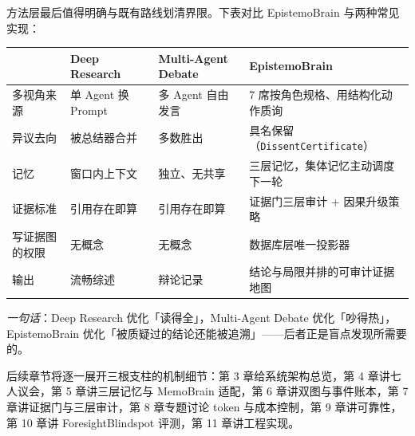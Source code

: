 方法层最后值得明确与既有路线划清界限。下表对比 EpistemoBrain 与两种常见实现：

\begin{table}[h]
\centering
\small
\begin{tabular}{@{}p{}p{}p{}p{}@{}}
\toprule
 & \textbf{Deep Research} & \textbf{Multi-Agent Debate} & \textbf{EpistemoBrain} \\
\midrule
多视角来源 & 单 Agent 换 Prompt & 多 Agent 自由发言 & 7 席按角色规格、用结构化动作质询 \\
异议去向 & 被总结器合并 & 多数胜出 & 具名保留（\texttt{DissentCertificate}） \\
记忆 & 窗口内上下文 & 独立、无共享 & 三层记忆，集体记忆主动调度下一轮 \\
证据标准 & 引用存在即算 & 引用存在即算 & 证据门三层审计 + 因果升级策略 \\
写证据图的权限 & 无概念 & 无概念 & 数据库层唯一投影器 \\
输出 & 流畅综述 & 辩论记录 & 结论与局限并排的可审计证据地图 \\
\bottomrule
\end{tabular}
\end{table}

\emph{一句话}：Deep Research 优化「读得全」，Multi-Agent Debate 优化「吵得热」，EpistemoBrain 优化「被质疑过的结论还能被追溯」——后者正是盲点发现所需要的。

后续章节将逐一展开三根支柱的机制细节：第 3 章给系统架构总览，第 4 章讲七人议会，第 5 章讲三层记忆与 MemoBrain 适配，第 6 章讲双图与事件账本，第 7 章讲证据门与三层审计，第 8 章专题讨论 token 与成本控制，第 9 章讲可靠性，第 10 章讲 ForesightBlindspot 评测，第 11 章讲工程实现。
